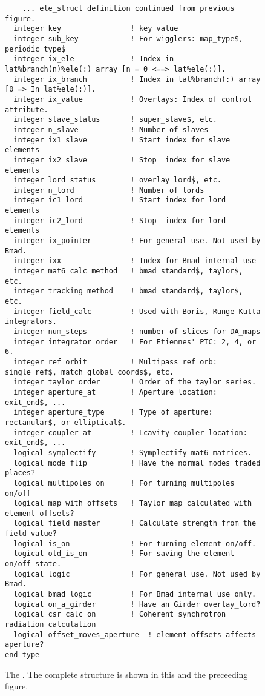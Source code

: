
\begin{figure}[tb]
\centering
\footnotesize
\begin{verbatim}
    ... ele_struct definition continued from previous figure.
  integer key                ! key value
  integer sub_key            ! For wigglers: map_type$, periodic_type$
  integer ix_ele             ! Index in lat%branch(n)%ele(:) array [n = 0 <==> lat%ele(:)].
  integer ix_branch          ! Index in lat%branch(:) array [0 => In lat%ele(:)].
  integer ix_value           ! Overlays: Index of control attribute. 
  integer slave_status       ! super_slave$, etc.
  integer n_slave            ! Number of slaves
  integer ix1_slave          ! Start index for slave elements
  integer ix2_slave          ! Stop  index for slave elements
  integer lord_status        ! overlay_lord$, etc.
  integer n_lord             ! Number of lords
  integer ic1_lord           ! Start index for lord elements
  integer ic2_lord           ! Stop  index for lord elements
  integer ix_pointer         ! For general use. Not used by Bmad.
  integer ixx                ! Index for Bmad internal use
  integer mat6_calc_method   ! bmad_standard$, taylor$, etc.
  integer tracking_method    ! bmad_standard$, taylor$, etc.
  integer field_calc         ! Used with Boris, Runge-Kutta integrators.
  integer num_steps          ! number of slices for DA_maps
  integer integrator_order   ! For Etiennes' PTC: 2, 4, or 6.
  integer ref_orbit          ! Multipass ref orb: single_ref$, match_global_coords$, etc.
  integer taylor_order       ! Order of the taylor series.
  integer aperture_at        ! Aperture location: exit_end$, ...
  integer aperture_type      ! Type of aperture: rectanular$, or elliptical$.
  integer coupler_at         ! Lcavity coupler location: exit_end$, ...
  logical symplectify        ! Symplectify mat6 matrices.
  logical mode_flip          ! Have the normal modes traded places?
  logical multipoles_on      ! For turning multipoles on/off
  logical map_with_offsets   ! Taylor map calculated with element offsets?
  logical field_master       ! Calculate strength from the field value?
  logical is_on              ! For turning element on/off.
  logical old_is_on          ! For saving the element on/off state.
  logical logic              ! For general use. Not used by Bmad.
  logical bmad_logic         ! For Bmad internal use only.
  logical on_a_girder        ! Have an Girder overlay_lord?
  logical csr_calc_on        ! Coherent synchrotron radiation calculation
  logical offset_moves_aperture  ! element offsets affects aperture?          
end type
\end{verbatim}
\caption[The . part 2.]{The . 
The complete structure is shown in this and the preceeding figure.}
\label{f:ele.struct2}
\end{figure}

